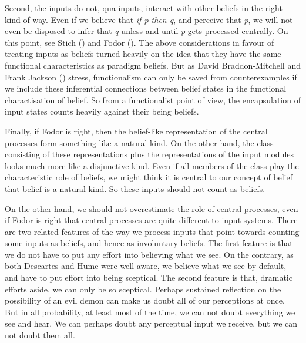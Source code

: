 \documentclass[
  11pt,
  letterpaper,
  DIV=11,
  numbers=noendperiod,
  oneside]{scrartcl}
\begin{document}
Second, the inputs do not, qua inputs, interact with other beliefs in
the right kind of way. Even if we believe that \emph{if p then q}, and
perceive that \emph{p}, we will not even be disposed to infer that
\emph{q} unless and until \emph{p} gets processed centrally. On this
point, see Stich () and Fodor
(). The above considerations in
favour of treating inputs as beliefs turned heavily on the idea that
they have the same functional characteristics as paradigm beliefs. But
as David Braddon-Mitchell and Frank Jackson
() stress, functionalism can
only be saved from counterexamples if we include these inferential
connections between belief states in the functional charactisation of
belief. So from a functionalist point of view, the encapsulation of
input states counts heavily against their being beliefs.

Finally, if Fodor is right, then the belief-like representation of the
central processes form something like a natural kind. On the other hand,
the class consisting of these representations plus the representations
of the input modules looks much more like a disjunctive kind. Even if
all members of the class play the characteristic role of beliefs, we
might think it is central to our concept of belief that belief is a
natural kind. So these inputs should not count as beliefs.

On the other hand, we should not overestimate the role of central
processes, even if Fodor is right that central processes are quite
different to input systems. There are two related features of the way we
process inputs that point towards counting some inputs as beliefs, and
hence as involuntary beliefs. The first feature is that we do not have
to put any effort into believing what we see. On the contrary, as both
Descartes and Hume were well aware, we believe what we see by default,
and have to put effort into being sceptical. The second feature is that,
dramatic efforts aside, we can only be so sceptical. Perhaps sustained
reflection on the possibility of an evil demon can make us doubt all of
our perceptions at once. But in all probability, at least most of the
time, we can not doubt everything we see and hear. We can perhaps doubt any perceptual
input we receive, but we can not doubt them all.
\end{document}
